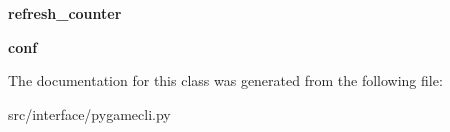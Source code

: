\begin{DoxyCompactItemize}
\item 
\hypertarget{classinterface_1_1pygamecli_1_1_client_a3ffb39f9ae93cfae520080286d2d813d}{{\bfseries refresh\-\_\-counter}}\label{classinterface_1_1pygamecli_1_1_client_a3ffb39f9ae93cfae520080286d2d813d}

\item 
\hypertarget{classinterface_1_1pygamecli_1_1_client_a630ff935559ffad8d89d31cc96ebca72}{{\bfseries conf}}\label{classinterface_1_1pygamecli_1_1_client_a630ff935559ffad8d89d31cc96ebca72}

\end{DoxyCompactItemize}


\-The documentation for this class was generated from the following file\-:\begin{DoxyCompactItemize}
\item 
src/interface/pygamecli.\-py\end{DoxyCompactItemize}
